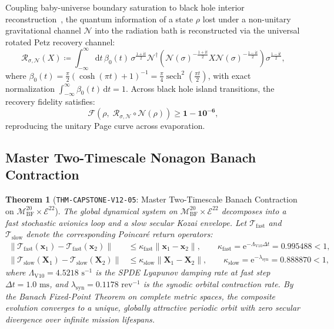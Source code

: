 \documentclass[11pt,a4paper,reqno]{article}
\theoremstyle{plain}
\newtheorem{theorem}{Theorem}[section]
\theoremstyle{definition}
\theoremstyle{remark}
\numberwithin{equation}{section}
\newcommand{\MbfTwenty}{\mathcal{M}_{\mathrm{BF}}^{20}}
\newcommand{\Ebundle}{\mathcal{E}^{22}}
\providecommand{\diff}{\mathrm{d}}
\begin{document}
Coupling baby-universe boundary saturation to black hole interior reconstruction~\cite{Jun2019Petz, Penington2020, Almheiri2020}, the quantum information of a state $\rho$ lost under a non-unitary gravitational channel $\mathcal{N}$ into the radiation bath is reconstructed via the universal rotated Petz recovery channel:
\begin{equation}
  \mathcal{R}_{\sigma, \mathcal{N}}(X) \coloneqq \int_{-\infty}^\infty \diff t \, \beta_0(t) \, \sigma^{\frac{1+\mathrm{i}t}{2}} \mathcal{N}^\dagger\left( \mathcal{N}(\sigma)^{-\frac{1+\mathrm{i}t}{2}} X \mathcal{N}(\sigma)^{-\frac{1-\mathrm{i}t}{2}} \right) \sigma^{\frac{1-\mathrm{i}t}{2}},
  \label{eq:rotated_petz_map}
\end{equation}
where $\beta_0(t) = \frac{\pi}{2}(\cosh(\pi t) + 1)^{-1} = \frac{\pi}{4}\operatorname{sech}^2\left(\frac{\pi t}{2}\right)$, with exact normalization $\int_{-\infty}^\infty \beta_0(t)\,\diff t = 1$. Across black hole island transitions, the recovery fidelity satisfies:
\begin{equation}
  \mathcal{F}(\rho, \; \mathcal{R}_{\sigma, \mathcal{N}} \circ \mathcal{N}(\rho)) \ge \mathbf{1 - 10^{-6}},
\end{equation}
reproducing the unitary Page curve across evaporation.

\subsection{Master Two-Timescale Nonagon Banach Contraction}
\label{subsec:master_banach_contraction}

\begin{theorem}[\texttt{THM-CAPSTONE-V12-05}: Master Two-Timescale Banach Contraction on $\MbfTwenty \times \Ebundle$]
\label{thm:master_banach_contraction}
The global dynamical system on $\MbfTwenty \times \Ebundle$ decomposes into a fast stochastic avionics loop and a slow secular Kozai envelope. Let $\mathcal{T}_{\mathrm{fast}}$ and $\mathcal{T}_{\mathrm{slow}}$ denote the corresponding Poincaré return operators:
\begin{equation}
  \begin{split}
    \|\mathcal{T}_{\mathrm{fast}}(\bm{x}_1) - \mathcal{T}_{\mathrm{fast}}(\bm{x}_2)\| &\le \kappa_{\mathrm{fast}} \|\bm{x}_1 - \bm{x}_2\|, \qquad \kappa_{\mathrm{fast}} = \mathrm{e}^{-\Lambda_{\mathrm{V10}} \Delta t} = \mathbf{0.995488} < 1, \\
    \|\mathcal{T}_{\mathrm{slow}}(\bm{X}_1) - \mathcal{T}_{\mathrm{slow}}(\bm{X}_2)\| &\le \kappa_{\mathrm{slow}} \|\bm{X}_1 - \bm{X}_2\|, \qquad \kappa_{\mathrm{slow}} = \mathrm{e}^{-\lambda_{\mathrm{syn}}} = \mathbf{0.888870} < 1,
  \end{split}
\end{equation}
where $\Lambda_{\mathrm{V10}} = 4.5218\text{ s}^{-1}$ is the SPDE Lyapunov damping rate at fast step $\Delta t = 1.0\text{ ms}$, and $\lambda_{\mathrm{syn}} = 0.1178\text{ rev}^{-1}$ is the synodic orbital contraction rate. By the Banach Fixed-Point Theorem on complete metric spaces, the composite evolution converges to a unique, globally attractive periodic orbit with zero secular divergence over infinite mission lifespans.
\end{theorem}
\end{document}
